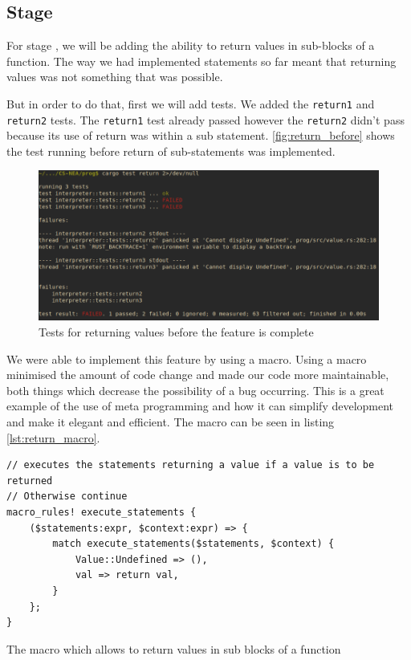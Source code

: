 \documentclass{article}
\begin{document}
\subsection{Stage \subsecnum}

For stage \subsecnum, we will be adding the ability to return values in
sub-blocks of a function. The way we had implemented statements so far meant
that returning values was not something that was possible.

But in order to do that, first we will add tests. We added the \texttt{return1}
and \texttt{return2} tests. The \texttt{return1} test already passed however
the \texttt{return2} didn't pass because its use of return was within a sub
statement. \autoref{fig:return_before} shows the test running before return of
sub-statements was implemented.

\begin{figure}
	\includegraphics[width=\textwidth]{return_before}
	\caption{Tests for returning values before the feature is complete}
	\label{fig:return_before}
\end{figure}

We were able to implement this feature by using a macro. Using a macro
minimised the amount of code change and made our code more maintainable, both
things which decrease the possibility of a bug occurring. This is a great
example of the use of meta programming and how it can simplify development and
make it elegant and efficient. The macro can be seen in listing
\ref{lst:return_macro}.

\begin{listing}
	\begin{verbatim}
// executes the statements returning a value if a value is to be returned
// Otherwise continue
macro_rules! execute_statements {
    ($statements:expr, $context:expr) => {
        match execute_statements($statements, $context) {
            Value::Undefined => (),
            val => return val,
        }
    };
}
	\end{verbatim}
	\caption{The macro which allows to return values in sub blocks of a
	function}
	\label{lst:return_macro}
\end{listing}
\end{document}
